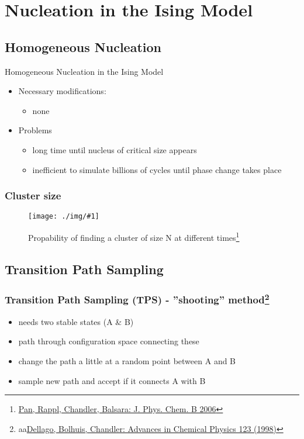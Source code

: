 \documentclass{beamer}
\newcommand{\fig}[2]{\begin{figure}[h]\begin{center}\texttt{[image: ./img/\#1]}\end{center}\caption{{#2}}\end{figure}}
\begin{document}
\section{Nucleation in the Ising Model}
\subsection{Homogeneous Nucleation}
\begin{frame}{Homogeneous Nucleation in the Ising Model}


\begin{itemize}
\item Necessary modifications:\begin{itemize}
\item none\\
\end{itemize}\end{itemize}\begin{itemize}
\item Problems
\begin{itemize}
\item long time until nucleus of critical size appears 
\item inefficient to simulate billions of cycles until phase change takes place
\end{itemize}
\end{itemize}
\end{frame}
\begin{frame}
\frametitle{Cluster size}
\fig{nsize.png}{Propability of finding a cluster of size N at different times\footnote{\href{http://www.ncbi.nlm.nih.gov/pubmed/16494425}{Pan, Rappl, Chandler, Balsara: J. Phys. Chem. B 2006}}}
\end{frame}
\subsection{Transition Path Sampling}
\begin{frame}\frametitle{Transition Path Sampling (TPS) - ''shooting'' method\footnote{aa\href{http://dx.doi.org/10.1063\%2F1.476378}{Dellago, Bolhuis, Chandler: Advances in Chemical Physics 123 (1998)}}}
\begin{itemize}
\item needs two stable states (A \& B)
\item path through configuration space connecting these
\item change the path a little at a random point between A and B
\item sample new path and accept if it connects A with B
\end{itemize}
\end{frame}
\end{document}
